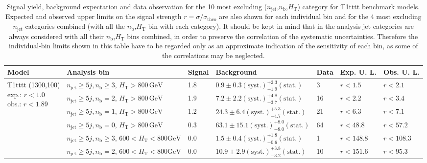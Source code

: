 \begin{table}[h!] 
  \scriptsize
  \caption{ 
  Signal yield, background expectation and data observation for the 10
  most excluding
  ($n_{\mathrm{jet}}$,$n_{\mathrm{b}}$,$H_{\mathrm{T}}$) category for
  T1tttt benchmark models.  
  Expected and observed upper limits on the signal strength
  $r=\sigma/\sigma_{\mathrm{theo}}$ are also shown  
  for each individual bin and for the 4 most excluding
  $n_{\mathrm{jet}}$ categories combined (with all the
  $n_{\mathrm{b}}$,$H_{\mathrm{T}}$ bin with each category). 
  It should be kept in mind that in the analysis jet categories are
  always considered with all their $n_{\mathrm{b}}$,$H_{\mathrm{T}}$
  bins  
  combined, in order to preserve the correlation of the systematic
  uncertainties.  
  Therefore the individual-bin limits shown in this table have to be
  regarded only as an approximate indication  
  of the sensitivity of each bin, as some of the correlations may be
  neglected. 
  \label{tab:sigBenchmarksYields_T1tttt}}
  \centering 
  \begin{tabular}{ lllllll } 
    \hline 
    Model & Analysis bin & Signal & Background & Data & Exp. U. L. & Obs. U. L. \\ \hline
\multirow{10}{*}{\parbox[t]{2cm}{T1tttt (1300,100)\\exp.: $r<1.0$\\obs.: $r<1.89$}}
 & $n_{\mathrm{jet}} \geq5j,n_{\mathrm{b}} \geq3$, $H_{\mathrm{T}} > 800 \, \mathrm{GeV}$ & 1.8 & $0.9 \pm 0.3 \mathrm{(syst.)} ^{+2.3}_{-1.9} \mathrm{(stat.)}$ & 3 & $r < 1.5$ & $r < 2.1$\\ 
 & $n_{\mathrm{jet}} \geq5j,n_{\mathrm{b}} =2$, $H_{\mathrm{T}} > 800 \, \mathrm{GeV}$ & 1.9 & $7.2 \pm 2.2 \mathrm{(syst.)} ^{+4.8}_{-3.7} \mathrm{(stat.)}$ & 16 & $r < 2.2$ & $r < 3.4$\\ 
 & $n_{\mathrm{jet}} \geq5j,n_{\mathrm{b}} =1$, $H_{\mathrm{T}} > 800 \, \mathrm{GeV}$ & 1.2 & $24.3 \pm 6.4 \mathrm{(syst.)} ^{+5.3}_{-4.7} \mathrm{(stat.)}$ & 21 & $r < 6.3$ & $r < 7.1$\\ 
 & $n_{\mathrm{jet}} \geq5j,n_{\mathrm{b}} =0$, $H_{\mathrm{T}} > 800 \, \mathrm{GeV}$ & 0.3 & $63.1 \pm 15.1 \mathrm{(syst.)} ^{+8.0}_{-8.0} \mathrm{(stat.)}$ & 64 & $r < 48.8$ & $r < 57.2$\\ 
 & $n_{\mathrm{jet}} \geq5j,n_{\mathrm{b}} \geq3$, $600 < H_{\mathrm{T}} < 800 \mathrm{GeV}$ & 0.0 & $1.5 \pm 0.4 \mathrm{(syst.)} ^{+1.8}_{-0.6} \mathrm{(stat.)}$ & 1 & $r < 148.8$ & $r < 108.3$\\ 
 & $n_{\mathrm{jet}} \geq5j,n_{\mathrm{b}} =2$, $600 < H_{\mathrm{T}} < 800 \mathrm{GeV}$ & 0.0 & $10.9 \pm 2.9 \mathrm{(syst.)} ^{+3.8}_{-3.2} \mathrm{(stat.)}$ & 10 & $r < 151.6$ & $r < 95.3$\\ 

\end{tabular}
\end{table}
